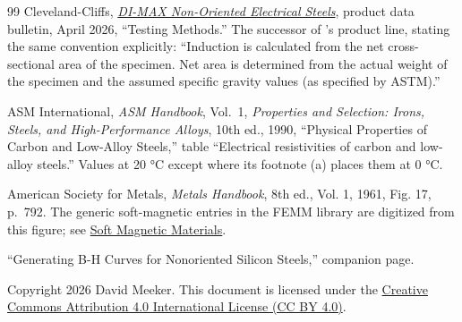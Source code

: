 \documentclass[
  11pt,
]{article}
\begin{document}
\begin{thebibliography}{99}
 Cleveland-Cliffs, \href{https://www.clevelandcliffs.com/_assets/_92ef20feb08a1fc0de91b85887c0f9e4/clevelandcliffs/db/1190/10494/file/CLF_ProductData_DiMaxM15M47_042026.pdf}{\emph{DI-MAX Non-Oriented Electrical Steels}}, product data bulletin, April 2026, ``Testing Methods.'' The successor of \cite{uss1978}'s product line, stating the same convention explicitly: ``Induction is calculated from the net cross-sectional area of the specimen. Net area is determined from the actual weight of the specimen and the assumed specific gravity values (as specified by ASTM).''

 ASM International, \emph{ASM Handbook}, Vol.~1, \emph{Properties and Selection: Irons, Steels, and High-Performance Alloys}, 10th ed., 1990, ``Physical Properties of Carbon and Low-Alloy Steels,'' table ``Electrical resistivities of carbon and low-alloy steels.'' Values at 20 °C except where its footnote (a) places them at 0 °C.

 American Society for Metals, \emph{Metals Handbook}, 8th ed., Vol. 1, 1961, Fig. 17, p.~792. The generic soft-magnetic entries in the FEMM library are digitized from this figure; see \href{https://www.femm.info/wiki/SoftMagneticMaterials}{Soft Magnetic Materials}.

 ``Generating B-H Curves for Nonoriented Silicon Steels,'' companion page.

\end{thebibliography}

\noindent Copyright 2026 David Meeker. This document is licensed under the \href{https://creativecommons.org/licenses/by/4.0/}{Creative Commons Attribution 4.0 International License (CC BY 4.0)}.
\end{document}
